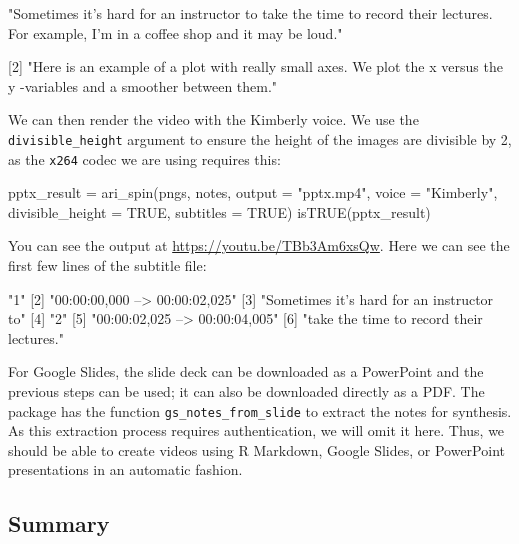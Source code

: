 \begin{Schunk}
\begin{Soutput}
[1] "Sometimes it’s hard for an instructor to take the time to record their lectures.
For example, I’m in a coffee shop and it may be loud."

[2] "Here is an example of a plot with really small axes.  We plot the x versus the y
-variables and a smoother between them."
\end{Soutput}
\end{Schunk}

We can then render the video with the Kimberly voice. We use the
\texttt{divisible\_height} argument to ensure the height of the images
are divisible by 2, as the \texttt{x264} codec we are using requires
this:

\begin{Schunk}
\begin{Sinput}
pptx_result = ari_spin(pngs, notes, output = "pptx.mp4", voice = "Kimberly",
    divisible_height = TRUE, subtitles = TRUE)
isTRUE(pptx_result)
\end{Sinput}
\end{Schunk}

You can see the output at \url{https://youtu.be/TBb3Am6xsQw}. Here we
can see the first few lines of the subtitle file:

\begin{Schunk}
\begin{Soutput}
[1] "1"                                       
[2] "00:00:00,000 --> 00:00:02,025"           
[3] "Sometimes it’s hard for an instructor to"
[4] "2"                                       
[5] "00:00:02,025 --> 00:00:04,005"           
[6] "take the time to record their lectures." 
\end{Soutput}
\end{Schunk}

For Google Slides, the slide deck can be downloaded as a PowerPoint and
the previous steps can be used; it can also be downloaded directly as a
PDF. The  package has the function
\texttt{gs\_notes\_from\_slide} to extract the notes for synthesis. As
this extraction process requires authentication, we will omit it here.
Thus, we should be able to create videos using R Markdown, Google
Slides, or PowerPoint presentations in an automatic fashion.

\hypertarget{summary}{%
\subsection{Summary}\label{summary}}

